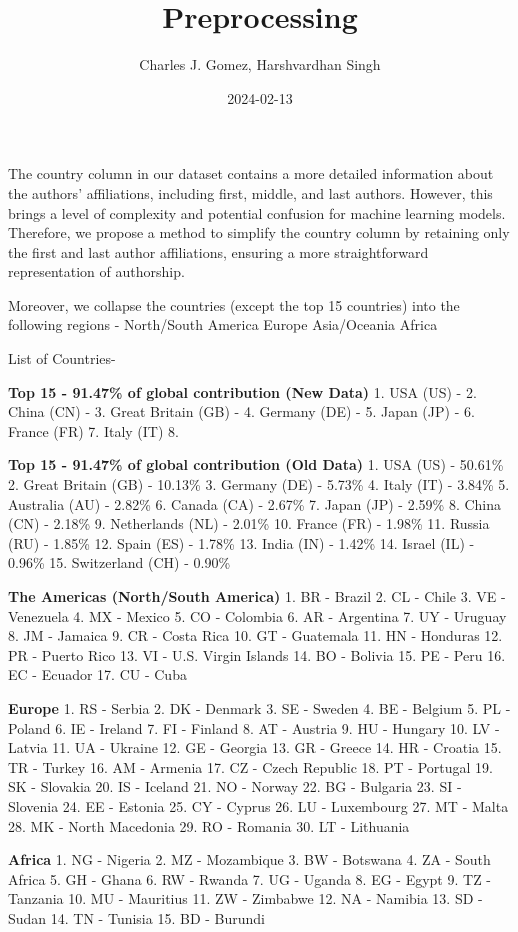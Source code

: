 \documentclass[
]{article}
\title{Preprocessing}
\author{Charles J. Gomez, Harshvardhan Singh}
\date{2024-02-13}
\begin{document}
\maketitle

The country column in our dataset contains a more detailed information
about the authors' affiliations, including first, middle, and last
authors. However, this brings a level of complexity and potential
confusion for machine learning models. Therefore, we propose a method to
simplify the country column by retaining only the first and last author
affiliations, ensuring a more straightforward representation of
authorship.

Moreover, we collapse the countries (except the top 15 countries) into
the following regions - North/South America Europe Asia/Oceania Africa

List of Countries-

\textbf{Top 15 - 91.47\% of global contribution (New Data)} 1. USA (US)
- 2. China (CN) - 3. Great Britain (GB) - 4. Germany (DE) - 5. Japan
(JP) - 6. France (FR) 7. Italy (IT) 8.

\textbf{Top 15 - 91.47\% of global contribution (Old Data)} 1. USA (US)
- 50.61\% 2. Great Britain (GB) - 10.13\% 3. Germany (DE) - 5.73\% 4.
Italy (IT) - 3.84\% 5. Australia (AU) - 2.82\% 6. Canada (CA) - 2.67\%
7. Japan (JP) - 2.59\% 8. China (CN) - 2.18\% 9. Netherlands (NL) -
2.01\% 10. France (FR) - 1.98\% 11. Russia (RU) - 1.85\% 12. Spain (ES)
- 1.78\% 13. India (IN) - 1.42\% 14. Israel (IL) - 0.96\% 15.
Switzerland (CH) - 0.90\%

\textbf{The Americas (North/South America)} 1. BR - Brazil 2. CL - Chile
3. VE - Venezuela 4. MX - Mexico 5. CO - Colombia 6. AR - Argentina 7.
UY - Uruguay 8. JM - Jamaica 9. CR - Costa Rica 10. GT - Guatemala 11.
HN - Honduras 12. PR - Puerto Rico 13. VI - U.S. Virgin Islands 14. BO -
Bolivia 15. PE - Peru 16. EC - Ecuador 17. CU - Cuba

\textbf{Europe} 1. RS - Serbia 2. DK - Denmark 3. SE - Sweden 4. BE -
Belgium 5. PL - Poland 6. IE - Ireland 7. FI - Finland 8. AT - Austria
9. HU - Hungary 10. LV - Latvia 11. UA - Ukraine 12. GE - Georgia 13. GR
- Greece 14. HR - Croatia 15. TR - Turkey 16. AM - Armenia 17. CZ -
Czech Republic 18. PT - Portugal 19. SK - Slovakia 20. IS - Iceland 21.
NO - Norway 22. BG - Bulgaria 23. SI - Slovenia 24. EE - Estonia 25. CY
- Cyprus 26. LU - Luxembourg 27. MT - Malta 28. MK - North Macedonia 29.
RO - Romania 30. LT - Lithuania

\textbf{Africa} 1. NG - Nigeria 2. MZ - Mozambique 3. BW - Botswana 4.
ZA - South Africa 5. GH - Ghana 6. RW - Rwanda 7. UG - Uganda 8. EG -
Egypt 9. TZ - Tanzania 10. MU - Mauritius 11. ZW - Zimbabwe 12. NA -
Namibia 13. SD - Sudan 14. TN - Tunisia 15. BD - Burundi
\end{document}
